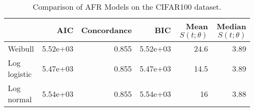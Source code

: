 \begin{table}
\centering
\caption{Comparison of AFR Models on the CIFAR100 dataset.}
\label{tab:cifar100}
\begin{tabular}{lrrrrr}
\toprule
{} &      AIC &  Concordance &      BIC &  Mean $S(t;\theta)$ &  Median $S(t;\theta)$ \\
\midrule
Weibull      & 5.52e+03 &        0.855 & 5.52e+03 &                24.6 &                  3.89 \\
Log logistic & 5.47e+03 &        0.855 & 5.47e+03 &                14.5 &                  3.89 \\
Log normal   & 5.54e+03 &        0.855 & 5.54e+03 &                  16 &                  3.88 \\
\bottomrule
\end{tabular}
\end{table}
